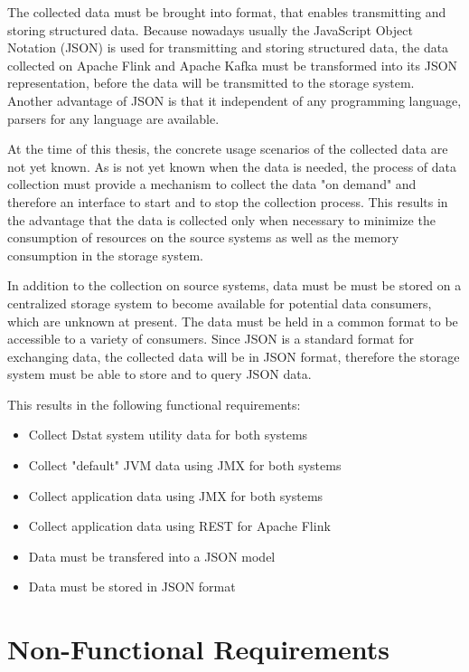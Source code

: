 The collected data must be brought into format, that enables transmitting and storing structured data.
Because nowadays usually the JavaScript Object Notation (JSON) is used for transmitting and storing
structured data, the data collected on Apache Flink and Apache Kafka must be transformed into its JSON
representation, before the data will be transmitted to the storage system. Another advantage of JSON is
that it independent of any programming language, parsers for any language are available.

At the time of this thesis, the concrete usage scenarios of the collected data are not yet known.
As is not yet known when the data is needed, the process of data collection must provide a mechanism
to collect the data "on demand" and therefore an interface to start and to stop the collection process.
This results in the advantage that the data is collected only when necessary to minimize the consumption
of resources on the source systems as well as the memory consumption in the storage system.

In addition to the collection on source systems, data must be must be stored on a centralized storage system
to become available for potential data consumers, which are unknown at present. The data must be held in a
common format to be accessible to a variety of consumers. Since JSON is a standard format for exchanging data,
the collected data will be in JSON format, therefore the storage system must be able to store and to query
JSON data.

This results in the following functional requirements:

\begin{itemize}
	\item Collect Dstat system utility data for both systems
	\item Collect "default" JVM data using JMX for both systems
	\item Collect application data using JMX for both systems
	\item Collect application data using REST for Apache Flink
	\item Data must be transfered into a JSON model
	\item Data must be stored in JSON format
\end{itemize}

\section{Non-Functional Requirements}


